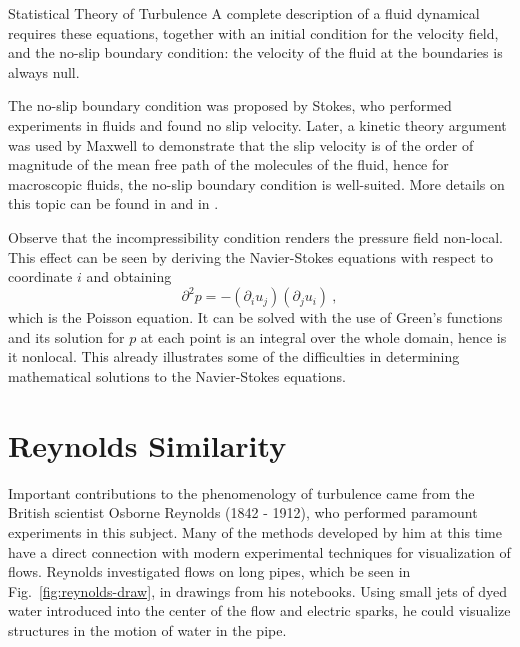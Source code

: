 \begin{chapter}{Statistical Theory of Turbulence}
A complete description of a fluid dynamical requires these
equations,
together with
an initial condition for the velocity field, and the no-slip boundary condition:
the velocity of the fluid at the boundaries is
always null.

The no-slip boundary condition was proposed by Stokes, who performed experiments in fluids and found no slip velocity. Later, a kinetic theory argument was used by Maxwell to demonstrate that the slip velocity is of the order of magnitude of the mean free path of the molecules of the fluid, hence for macroscopic fluids, the no-slip boundary condition is well-suited. More details on this topic can be found in \textcite{denniston2006,shen2007} and in \textcite[Chap.6]{eyink2008turbulence}.

Observe that the incompressibility condition renders the pressure field
non-local. This effect can be seen by deriving
the Navier-Stokes equations with respect to coordinate $i$ and obtaining
\begin{equation}
    \partial^2 p = - (\partial_i u_j) (\partial_j u_i) \ ,
\end{equation}
which is the Poisson equation. It can be solved with the use of
Green's functions and its solution for $p$ at each point is an integral
over the whole domain, hence is it nonlocal.
This already illustrates
some of the difficulties in determining mathematical
solutions to the Navier-Stokes equations.

\section{Reynolds Similarity} \label{sec:similarity}

Important contributions to the phenomenology of turbulence
came from the British scientist Osborne Reynolds (1842 - 1912), who
performed paramount experiments in this subject.
Many of the methods developed by him at this time have a direct
connection with modern experimental techniques for visualization
of flows. Reynolds investigated flows on long pipes,
which be seen in Fig.~\ref{fig:reynolds-draw}, in drawings
from his notebooks.
Using small jets of dyed water introduced into
the center of the flow and electric sparks, he could visualize
structures in the motion of water in the pipe.


\end{chapter}
